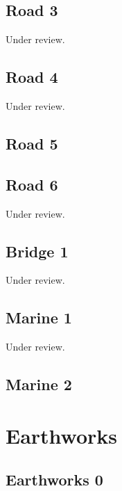 \documentclass{scrartcl}
\begin{document}
\subsection{Road 3} %
\label{sec:road_3}
Under review.%
\clearpage

\subsection{Road 4} %
\label{sec:road_4}
Under review.%
\clearpage

\subsection{Road 5} %
\label{sec:road_5}
\clearpage

\subsection{Road 6} %
\label{sec:road_6}
Under review.%
\clearpage

\subsection{Bridge 1} %
\label{sec:bridge_1}
Under review.%
\clearpage

\subsection{Marine 1} %
\label{sec:marine_1}
Under review.%
\clearpage

\subsection{Marine 2} %
\label{sec:marine_2}
\clearpage

\section{Earthworks}

\subsection{Earthworks 0}
\label{sec:earth_0}
\clearpage
\end{document}
